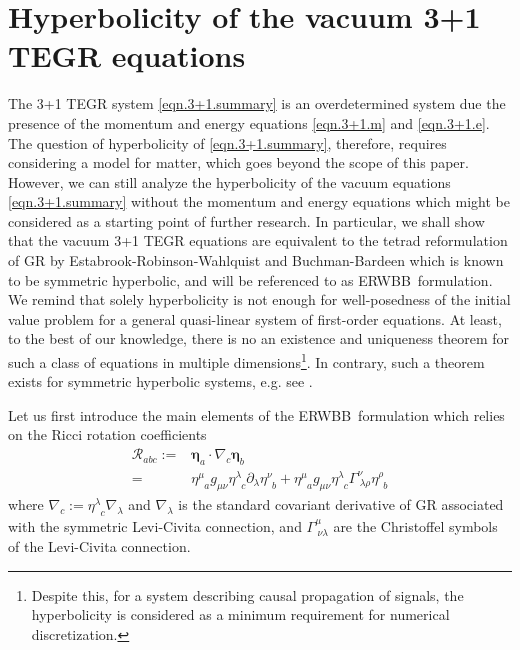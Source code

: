 \documentclass[
10pt, %
a4paper, %
oneside, %
twocolumn,
headinclude,footinclude, %
BCOR5mm, %
]{scrartcl}
\newcommand{\ERWBB}{{ERWBB}}
\newcommand{\pd}[1]{\partial_{#1}}
\newcommand{\itetrsymbol}{\eta}
\newcommand{\itetr}[2]{\itetrsymbol^{#1}_{\phantom{#1}#2}}
\begin{document}
	
	
	\section{Hyperbolicity of the vacuum 3+1 TEGR equations}

	The 3+1 TEGR system \eqref{eqn.3+1.summary} is an overdetermined system due
	the presence of the momentum and energy equations \eqref{eqn.3+1.m} and
	\eqref{eqn.3+1.e}. The question of hyperbolicity of \eqref{eqn.3+1.summary},
	therefore, requires considering a model for matter, which goes beyond the
	scope of this paper. However, we can still analyze the hyperbolicity of the
	vacuum equations \eqref{eqn.3+1.summary} without the momentum and energy
	equations which might be considered as a starting point of further research.
	In particular, we shall show that the vacuum 3+1 TEGR equations are
	equivalent to the tetrad reformulation of GR by Estabrook-Robinson-Wahlquist
	\cite{Estabrook1997} and Buchman-Bardeen \cite{Buchman2003} which is known
	to be symmetric hyperbolic, and will be referenced to as \ERWBB\
	formulation. We remind that solely hyperbolicity is not enough for
	well-posedness of the initial value problem for a general quasi-linear
	system of first-order equations. At least, to the best of our knowledge,
	there is no an existence and uniqueness theorem for such a class of
	equations in multiple dimensions\footnote{ Despite this, for a system
	describing causal propagation of 	signals, the hyperbolicity is considered
	as a minimum requirement for numerical discretization.}. In contrary, such a
	theorem exists for symmetric hyperbolic systems, e.g. see \cite{Serre2007}.
	
	Let us first introduce the main elements of the \ERWBB\ formulation which relies on the Ricci 
	rotation coefficients
	\begin{align}\label{eqn.Ricci.rot}
		\mathcal{R}_{abc} 
		:= & \bm{\itetrsymbol}_a\cdot\nabla_c \bm{\itetrsymbol}_b \nonumber\\
		= & \itetr{\mu}{a} g_{\mu\nu} \itetr{\lambda}{c} \pd{\lambda} \itetr{\nu}{b} 
		+   \itetr{\mu}{a} g_{\mu\nu} \itetr{\lambda}{c} \Gamma^{\nu}_{\ \lambda\rho} 
		\itetr{\rho}{b}	
	\end{align}
	where $ \nabla_c := \itetr{\lambda}{c} \nabla_{\lambda} $ and $ \nabla_{\lambda} $ is the 
	standard 
	covariant derivative of GR associated with the symmetric Levi-Civita connection, and $ 
	\Gamma^{\mu}_{\ 
		\nu\lambda} $ are the Christoffel symbols of the Levi-Civita connection.
	
\end{document}
